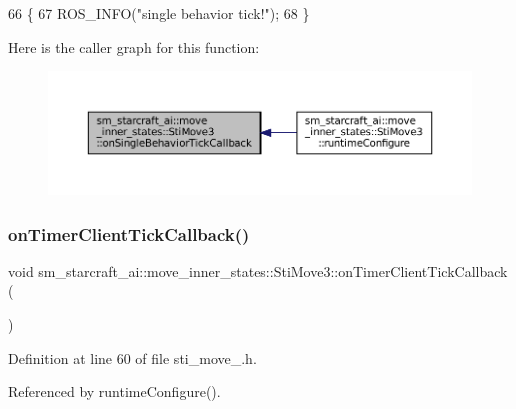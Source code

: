 \begin{DoxyCode}
66   \{
67     ROS\_INFO(\textcolor{stringliteral}{"single behavior tick!"});
68   \}
\end{DoxyCode}
Here is the caller graph for this function\+:
\nopagebreak
\begin{figure}[H]
\begin{center}
\leavevmode
\includegraphics[width=350pt]{structsm__starcraft__ai_1_1move__inner__states_1_1StiMove3_aa14b967f2718e5a6685966c8af317c93_icgraph}
\end{center}
\end{figure}
\mbox{\label{structsm__starcraft__ai_1_1move__inner__states_1_1StiMove3_aae9ba9faf3d05bfb5353a6569a895b31}} 
\subsubsection{\texorpdfstring{on\+Timer\+Client\+Tick\+Callback()}{onTimerClientTickCallback()}}
{\footnotesize\ttfamily void sm\+\_\+starcraft\+\_\+ai\+::move\+\_\+inner\+\_\+states\+::\+Sti\+Move3\+::on\+Timer\+Client\+Tick\+Callback (\begin{DoxyParamCaption}{ }\end{DoxyParamCaption})\hspace{0.3cm}{\ttfamily [inline]}}



Definition at line 60 of file sti\+\_\+move\+\_.\+h.



Referenced by runtime\+Configure().


